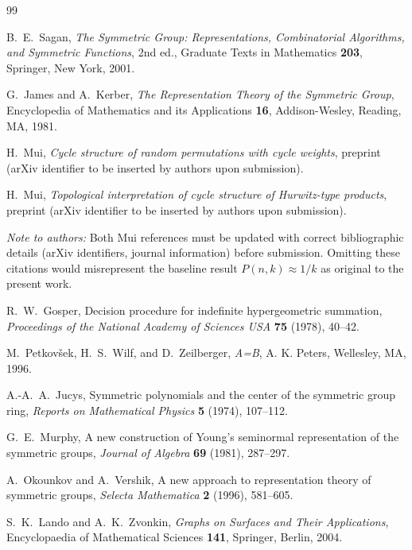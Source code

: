 \documentclass[12pt, a4paper]{amsart}
\theoremstyle{plain}
\theoremstyle{definition}
\theoremstyle{remark}
\begin{document}
\begin{thebibliography}{99}

B.~E.~Sagan,
\emph{The Symmetric Group: Representations, Combinatorial Algorithms, and Symmetric
Functions},
2nd ed., Graduate Texts in Mathematics \textbf{203},
Springer, New York, 2001.

G.~James and A.~Kerber,
\emph{The Representation Theory of the Symmetric Group},
Encyclopedia of Mathematics and its Applications \textbf{16},
Addison-Wesley, Reading, MA, 1981.

H.~Mui,
\emph{Cycle structure of random permutations with cycle weights},
preprint (arXiv identifier to be inserted by authors upon submission).

H.~Mui,
\emph{Topological interpretation of cycle structure of Hurwitz-type products},
preprint (arXiv identifier to be inserted by authors upon submission).

\noindent\emph{Note to authors:} Both Mui references must be updated with
correct bibliographic details (arXiv identifiers, journal information)
before submission.  Omitting these citations would misrepresent the baseline
result $P(n,k)\approx 1/k$ as original to the present work.

R.~W.~Gosper,
Decision procedure for indefinite hypergeometric summation,
\emph{Proceedings of the National Academy of Sciences USA} \textbf{75} (1978),
40--42.

M.~Petkov\v{s}ek, H.~S.~Wilf, and D.~Zeilberger,
\emph{A=B},
A. K. Peters, Wellesley, MA, 1996.

A.-A.~A.~Jucys,
Symmetric polynomials and the center of the symmetric group ring,
\emph{Reports on Mathematical Physics} \textbf{5} (1974), 107--112.

G.~E.~Murphy,
A new construction of Young's seminormal representation of the symmetric groups,
\emph{Journal of Algebra} \textbf{69} (1981), 287--297.

A.~Okounkov and A.~Vershik,
A new approach to representation theory of symmetric groups,
\emph{Selecta Mathematica} \textbf{2} (1996), 581--605.

S.~K.~Lando and A.~K.~Zvonkin,
\emph{Graphs on Surfaces and Their Applications},
Encyclopaedia of Mathematical Sciences \textbf{141},
Springer, Berlin, 2004.


\end{thebibliography}
\end{document}
